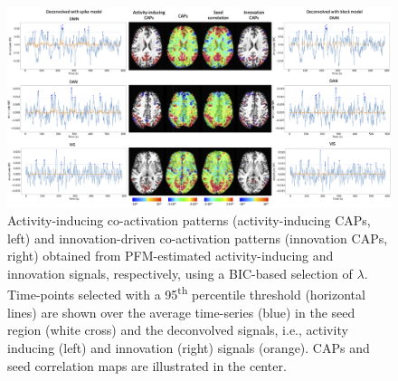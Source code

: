 \begin{figure}[t!]
    \begin{center}
        \includegraphics[width=\textwidth]{figures/caps.png}
    \end{center}
    \caption{Activity-inducing co-activation patterns (activity-inducing CAPs,
    left) and innovation-driven co-activation patterns (innovation CAPs, right)
    obtained from PFM-estimated activity-inducing and innovation signals,
    respectively, using a BIC-based selection of $\lambda$. Time-points selected
    with a 95\textsuperscript{th} percentile threshold (horizontal lines) are
    shown over the average time-series (blue) in the seed region (white cross)
    and the deconvolved signals, i.e., activity inducing (left) and innovation
    (right) signals (orange). CAPs and seed correlation maps are illustrated in
    the center.}
\label{fig:caps}
\end{figure}